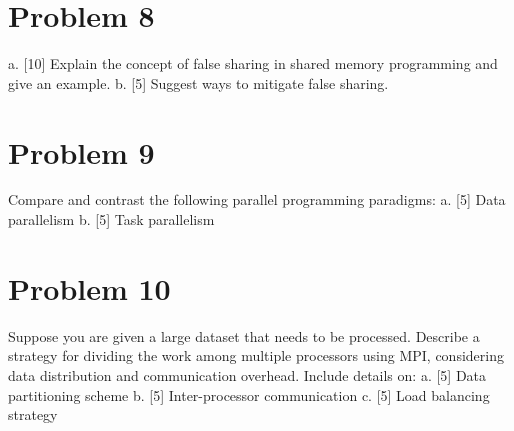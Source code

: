 \documentclass{article}
\begin{document}
\section*{Problem 8}
a. [10] Explain the concept of false sharing in shared memory programming and give an example.
b. [5]  Suggest ways to mitigate false sharing.


\section*{Problem 9}
Compare and contrast the following parallel programming paradigms:
a. [5] Data parallelism
b. [5] Task parallelism


\section*{Problem 10}
Suppose you are given a large dataset that needs to be processed.  Describe a strategy for dividing the work among multiple processors using MPI, considering data distribution and communication overhead.  Include details on:
a. [5] Data partitioning scheme
b. [5] Inter-processor communication
c. [5] Load balancing strategy
\end{document}
